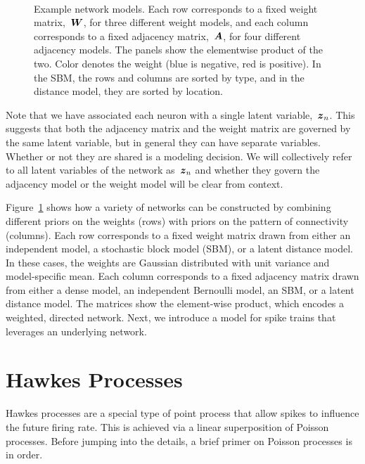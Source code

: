 \begin{figure}[t!]
\begin{subfigure}[b]{1.10in}
  \end{subfigure}
  \\
  \vspace{-.1in}
  \caption[Examples of network models]{Example network models.  Each
    row corresponds to a fixed weight matrix,~$\boldsymbol{W}$, for three
    different weight models, and each column corresponds to a fixed
    adjacency matrix,~$\boldsymbol{A}$, for four different adjacency models. The
    panels show the elementwise product of the two. Color denotes the
    weight (blue is negative, red is positive).  In the SBM, the rows
    and columns are sorted by type, and in the distance model, they
    are sorted by location. }
  \label{fig:network_models}
\end{figure}

Note that we have associated each neuron with a single latent variable,~$\boldsymbol{z}_n$.
This suggests that both the adjacency matrix and the weight matrix are
governed by the same latent variable, but in general they can have separate
variables. Whether or not they are shared is a modeling decision. We will
collectively refer to all latent variables of the network as~$\boldsymbol{z}_n$ and
whether they govern the adjacency model or the weight model will be clear
from context.


Figure~\ref{fig:network_models} shows how a variety of networks can be
constructed by combining different priors on the weights (rows) with
priors on the pattern of connectivity (columns). Each row corresponds
to a fixed weight matrix drawn from either an independent model, a
stochastic block model (SBM), or a latent distance model. In these
cases, the weights are Gaussian distributed with unit variance and
model-specific mean. Each column corresponds to a fixed adjacency
matrix drawn from either a dense model, an independent
Bernoulli model, an SBM, or a latent distance model. The matrices show
the element-wise product, which encodes a weighted, directed
network. Next, we introduce a model for spike trains that leverages
an underlying network.


\section{Hawkes Processes}
\label{sec:hawkes_processes}
Hawkes processes \citep{Hawkes-1971} are a special type of point process
that allow spikes to influence the future firing rate. This is achieved
via a linear superposition of Poisson processes. Before jumping into the
details, a brief primer on Poisson processes is in order.

